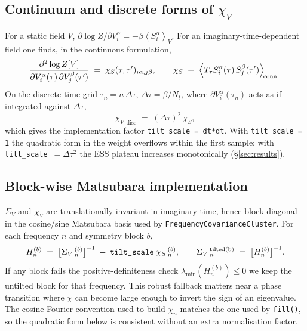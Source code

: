 \documentclass[11pt]{article}
\newcommand{\ev}[1]{\left\langle #1 \right\rangle}
\newcommand{\Sig}{\Sigma_V}
\begin{document}
\subsection{Continuum and discrete forms of $\chi_V$}
For a static field $V$, $\partial \log Z/\partial V_i^\alpha = -\beta \ev{S_i^\alpha}_V$.
For an imaginary-time-dependent field one finds, in the continuous
formulation,
\begin{equation}
  \frac{\partial^{2}\log Z[V]}{\partial V_i^\alpha(\tau)\,\partial V_j^\beta(\tau')}
  \;=\; \chi_S(\tau,\tau')_{i\alpha,j\beta},
  \qquad
  \chi_S \;\equiv\; \ev{T_\tau S_i^\alpha(\tau)\,S_j^\beta(\tau')}_{\!\rm conn}.
  \label{eq:chiS}
\end{equation}
On the discrete time grid $\tau_n = n\,\Delta\tau$, $\Delta\tau = \beta/N_t$,
where $\partial V_i^\alpha(\tau_n)$ acts as if integrated against
$\Delta\tau$,
\begin{equation}
  \chi_V \big|_{\text{disc}} \;=\; (\Delta\tau)^{2}\,\chi_S,
  \label{eq:dt2}
\end{equation}
which gives the implementation factor \verb!tilt_scale = dt*dt!.
With \verb!tilt_scale = 1! the quadratic form in the weight overflows
within the first sample; with \verb!tilt_scale!~$=\Delta\tau^{2}$ the
ESS plateau increases monotonically (\S\ref{sec:results}).

\subsection{Block-wise Matsubara implementation}
$\Sig$ and $\chi_V$ are translationally invariant in imaginary time,
hence block-diagonal in the cosine/sine Matsubara basis used by
\texttt{FrequencyCovarianceCluster}. For each frequency $n$ and symmetry
block $b$,
\begin{equation}
  H_n^{(b)} \;=\; \bigl[\Sig\,_n^{(b)}\bigr]^{-1}
              \;-\; \texttt{tilt\_scale}\;\chi_S\,_n^{(b)},
  \qquad
  \Sig\,_n^{\rm tilted (b)} \;=\; \bigl[H_n^{(b)}\bigr]^{-1}.
  \label{eq:Hblock}
\end{equation}
If any block fails the positive-definiteness check
$\lambda_{\min}(H_n^{(b)}) \le 0$ we keep the untilted block for that
frequency. This robust fallback matters near a phase transition where
$\chi$ can become large enough to invert the sign of an eigenvalue.
The cosine-Fourier convention used to build $\chi_n$ matches the one
used by \texttt{fill()}, so the quadratic form below is consistent
without an extra normalisation factor.
\end{document}
